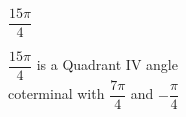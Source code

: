 {$\dfrac{15\pi}{4}$}
{$\dfrac{15\pi}{4}$ is a Quadrant IV angle\\
coterminal with $\dfrac{7\pi}{4}$ and $-\dfrac{\pi}{4}$

\begin{center}
\end{center}}